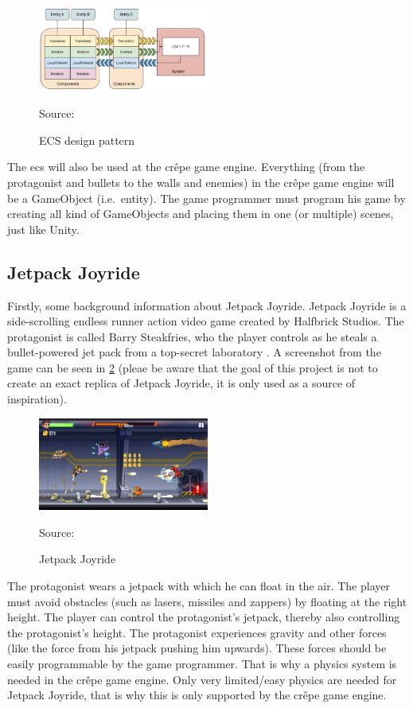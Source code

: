 \documentclass{projdoc}
\begin{document}
\begin{figure}
	\centering
	\includegraphics[width=0.5\textwidth]{img/ECSBlockDiagram.png}
	\caption{ECS design pattern}
	Source: \autocite{img:ecs-block-diag}
	\label{fig:ecs-block-diagram}
\end{figure}

The \gls{ecs} will also be used at the cr\^epe game engine. Everything (from the
protagonist and bullets to the walls and enemies) in the cr\^epe game engine will be
a GameObject (i.e.~entity). The game programmer must program his game by creating all
kind of GameObjects and placing them in one (or multiple) scenes, just like Unity.

\subsection{Jetpack Joyride}

Firstly, some background information about Jetpack Joyride. Jetpack Joyride is a
side-scrolling endless runner action video game created by Halfbrick Studios. The
protagonist is called Barry Steakfries, who the player controls as he steals a
bullet-powered jet pack from a top-secret laboratory
\autocite{wikipedia:jetpack-joyride}. A screenshot from the game can be seen in
\cref{fig:jetpack-joyride} (pleae be aware that the goal of this project is not to
create an exact replica of Jetpack Joyride, it is only used as a source of
inspiration).

\begin{figure}
	\centering
	\includegraphics[width=0.5\textwidth]{img/JetpackJoyride.jpg}
	\caption{Jetpack Joyride}
	Source: \autocite{img:jetpack-joyride}
	\label{fig:jetpack-joyride}
\end{figure}

The protagonist wears a jetpack with which he can float in the air. The player must
avoid obstacles (such as lasers, missiles and zappers) by floating at the right
height. The player can control the protagonist's jetpack, thereby also controlling
the protagonist's height. The protagonist experiences gravity and other forces (like
the force from his jetpack pushing him upwards). These forces should be easily
programmable by the game programmer. That is why a physics system is needed in the
cr\^epe game engine. Only very limited/easy physics are needed for Jetpack Joyride,
that is why this is only supported by the cr\^epe game engine.
\end{document}
